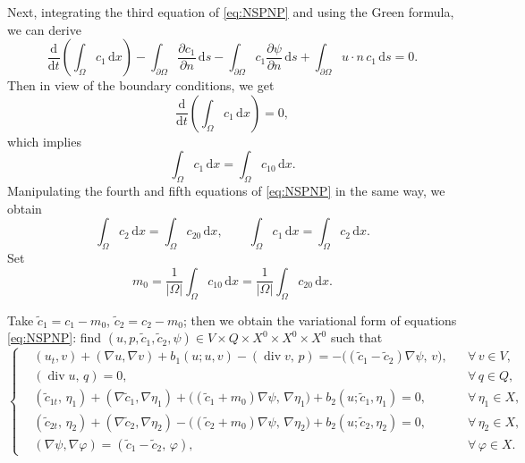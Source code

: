 Next, integrating the third equation of \eqref{eq:NSPNP} and using the
Green formula, we can derive
\begin{equation}
  \frac{\mathrm{d}}{\mathrm{d}t}
  \!\left(\int_{\Omega}c_{1}\,\mathrm{d}x\right)
  - \int_{\partial\Omega}\frac{\partial c_{1}}{\partial n}\,\mathrm{d}s
  - \int_{\partial\Omega}c_{1}\frac{\partial\psi}{\partial n}\,\mathrm{d}s
  + \int_{\partial\Omega}u\cdot n\,c_{1}\,\mathrm{d}s = 0.
  \label{eq:c1-int1}
\end{equation}
Then in view of the boundary conditions, we get
\begin{equation}
  \frac{\mathrm{d}}{\mathrm{d}t}
  \!\left(\int_{\Omega}c_{1}\,\mathrm{d}x\right) = 0,
  \label{eq:c1-conserve}
\end{equation}
which implies
\begin{equation}
  \int_{\Omega}c_{1}\,\mathrm{d}x = \int_{\Omega}c_{10}\,\mathrm{d}x.
  \label{eq:c1-mass}
\end{equation}
Manipulating the fourth and fifth equations of \eqref{eq:NSPNP} in the
same way, we obtain
\begin{equation}
  \int_{\Omega}c_{2}\,\mathrm{d}x = \int_{\Omega}c_{20}\,\mathrm{d}x,
  \qquad
  \int_{\Omega}c_{1}\,\mathrm{d}x = \int_{\Omega}c_{2}\,\mathrm{d}x.
  \label{eq:c12-mass}
\end{equation}
Set
\begin{equation}
  m_{0}
  = \frac{1}{|\Omega|}\int_{\Omega}c_{10}\,\mathrm{d}x
  = \frac{1}{|\Omega|}\int_{\Omega}c_{20}\,\mathrm{d}x.
  \label{eq:m0}
\end{equation}

Take $\tilde{c}_{1}=c_{1}-m_{0}$, $\tilde{c}_{2}=c_{2}-m_{0}$; then we
obtain the variational form of equations \eqref{eq:NSPNP}: find
$(u,p,\tilde{c}_{1},\tilde{c}_{2},\psi)\in V\times Q\times X^{0}\times X^{0}\times X^{0}$
such that
\begin{equation}
  \left\{
  \begin{aligned}
    &(u_{t},v) + (\nabla u,\nabla v) + b_{1}(u;u,v)
      - (\operatorname{div}v,\,p)
      = -\bigl((\tilde{c}_{1}-\tilde{c}_{2})\nabla\psi,\,v\bigr),
      &&\forall\,v\in V,\\[4pt]
    &(\operatorname{div}u,\,q) = 0,
      &&\forall\,q\in Q,\\[4pt]
    &(\tilde{c}_{1t},\,\eta_{1})
      + (\nabla\tilde{c}_{1},\nabla\eta_{1})
      + \bigl((\tilde{c}_{1}+m_{0})\nabla\psi,\,\nabla\eta_{1}\bigr)
      + b_{2}(u;\tilde{c}_{1},\eta_{1}) = 0,
      &&\forall\,\eta_{1}\in X,\\[4pt]
    &(\tilde{c}_{2t},\,\eta_{2})
      + (\nabla\tilde{c}_{2},\nabla\eta_{2})
      - \bigl((\tilde{c}_{2}+m_{0})\nabla\psi,\,\nabla\eta_{2}\bigr)
      + b_{2}(u;\tilde{c}_{2},\eta_{2}) = 0,
      &&\forall\,\eta_{2}\in X,\\[4pt]
    &(\nabla\psi,\nabla\varphi) = (\tilde{c}_{1}-\tilde{c}_{2},\,\varphi),
      &&\forall\,\varphi\in X.
  \end{aligned}
  \right.
  \label{eq:variational}
\end{equation}

